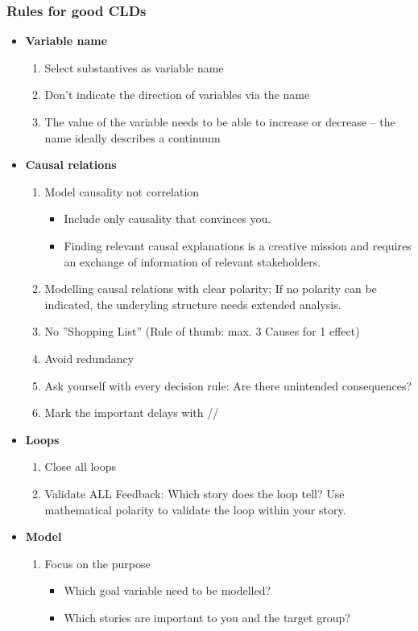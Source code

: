 \subsubsection{Rules for good CLDs}

\begin{itemize}
	\tightlist
	\item \textbf{Variable name}
	\begin{enumerate}
		\item Select substantives as variable name
		\item Don't indicate the direction of variables via the name
		\item The value of the variable needs to be able to increase or decrease
		– the name ideally describes a continuum
	\end{enumerate}
	\item \textbf{Causal relations}
	\begin{enumerate}
		\item Model causality not correlation
		\begin{itemize}
			\item Include only causality that convinces you.
			\item Finding relevant causal explanations is a creative mission and
			requires an exchange of information of relevant stakeholders.
		\end{itemize}
		\item Modelling causal relations with clear polarity; If no polarity
		can be indicated, the underyling structure needs extended analysis.
		\item No ''Shopping List'' (Rule of thumb: max. 3 Causes for 1 effect)
		\item Avoid redundancy
		\item Ask yourself with every decision rule: Are there unintended
		consequences?
		\item Mark the important delays with //
	\end{enumerate}
	\item \textbf{Loops}
	\begin{enumerate}
		\item Close all loops
		\item Validate ALL Feedback: Which story does the loop tell? Use
		mathematical polarity to validate the loop within your story.
	\end{enumerate}
	\item \textbf{Model}
	\begin{enumerate}
		\item Focus on the purpose
		\begin{itemize}
			\item Which goal variable need to be modelled?
			\item Which stories are important to you and the target group?
		\end{itemize}
	\end{enumerate}
\end{itemize}

